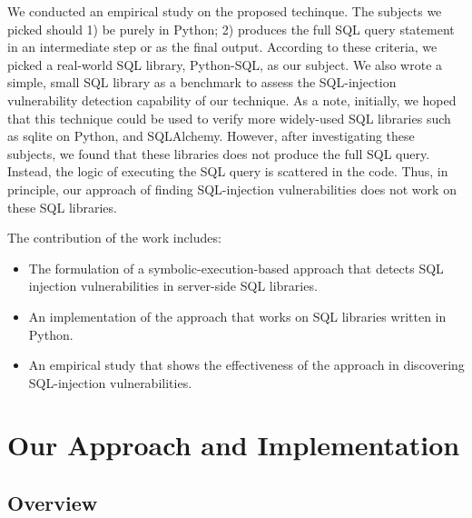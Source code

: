 \documentclass[conference]{IEEEtran}
\begin{document}
We conducted an empirical study on the proposed techinque. The subjects we picked should 1) be purely in Python; 2) produces the full SQL query statement in an intermediate step or as the final output. According to these criteria, we picked a real-world SQL library, Python-SQL, as our subject. We also wrote a simple, small SQL library as a benchmark to assess the SQL-injection vulnerability detection capability of our technique.
As a note, initially, we hoped that this technique could be used to verify more widely-used SQL libraries such as sqlite on Python, and SQLAlchemy. However, after investigating these subjects, we found that these libraries does not produce the full SQL query. Instead, the logic of executing the SQL query is scattered in the code. Thus, in principle, our approach of finding SQL-injection vulnerabilities does not work on these SQL libraries.

The contribution of the work includes:

\begin{itemize}

\item The formulation of a symbolic-execution-based approach that detects SQL injection vulnerabilities in server-side SQL libraries.

\item An implementation of the approach that works on SQL libraries written in Python.

\item An empirical study that shows the effectiveness of the approach in discovering SQL-injection vulnerabilities.

\end{itemize}

\section{Our Approach and Implementation}
\label{approach}

\subsection{Overview}
\end{document}

